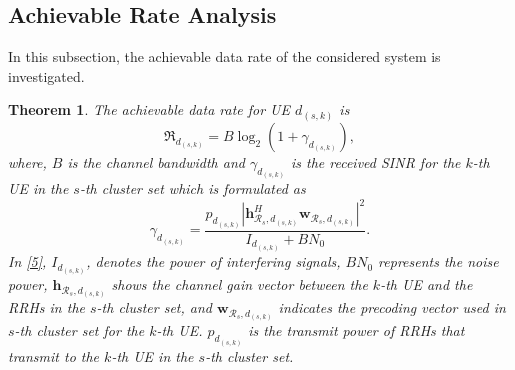 \documentclass[journal,onecolumn,11pt,draftcls,doublespace]{IEEEtran}
\newtheorem{theorem}{Theorem}
\begin{document}
\subsection{Achievable Rate Analysis}
In this subsection, the achievable data rate of the considered system is investigated. 
\begin{theorem}\label{t1}
The achievable data rate for UE $d_{(s,k)}$ is
\begin{equation}\label{e1}
\mathfrak{R}_{d_{(s,k)}} = B \log_2(1+\gamma_{d_{(s,k)}}),
\end{equation}
where, $B$ is the channel bandwidth and $\gamma_{d_{(s,k)}}$ is the received SINR for the $k$-th UE in the $s$-th cluster set which is formulated as
\begin{equation}\label{5}
\gamma_{d_{(s,k)}}= \frac{p_{d_{(s,k)}}|\boldsymbol{h}_{\mathcal{R}_s, d_{(s,k)}}^H \boldsymbol{w}_{\mathcal{R}_{s},d_{(s,k)}}|^2}{I_{d_{(s,k)}}+BN_0}.
\end{equation}
In \eqref{5}, $I_{d_{(s,k)}}$, denotes the power of interfering signals, $BN_0$ represents the noise power, $\boldsymbol{h}_{\mathcal{R}_s, d_{(s,k)}}$ shows the channel gain vector between the $k$-th UE and the RRHs in the $s$-th cluster set, and $\boldsymbol{w}_{\mathcal{R}_{s},d_{(s,k)}}$ indicates the precoding vector used in $s$-th cluster set for the $k$-th UE.
$p_{d_{(s,k)}}$ is the transmit power of RRHs that transmit to the $k$-th UE in the $s$-th cluster set.
\end{theorem}
\end{document}

